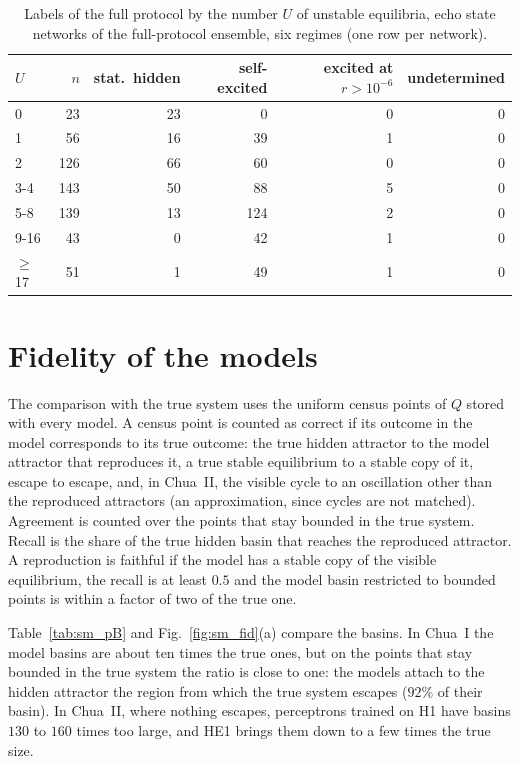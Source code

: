 \documentclass[aip,cha,preprint,amsmath,amssymb,longbibliography]{revtex4-2}
\begin{document}
\begin{table}
\caption{Labels of the full protocol by the number $U$ of unstable equilibria, echo state networks of the full-protocol
ensemble, six regimes (one row per network).}
\label{tab:sm_labels}
\begin{ruledtabular}
\begin{tabular}{lrrrrr}
$U$ & $n$ & stat.\ hidden & self-excited & excited at $r>10^{-6}$ & undetermined \\
\hline
0 & 23 & 23 & 0 & 0 & 0 \\
1 & 56 & 16 & 39 & 1 & 0 \\
2 & 126 & 66 & 60 & 0 & 0 \\
3-4 & 143 & 50 & 88 & 5 & 0 \\
5-8 & 139 & 13 & 124 & 2 & 0 \\
9-16 & 43 & 0 & 42 & 1 & 0 \\
$\ge$17 & 51 & 1 & 49 & 1 & 0 \\
\end{tabular}
\end{ruledtabular}
\end{table}


\section{Fidelity of the models}

The comparison with the true system uses the uniform census points of $Q$ stored with every model. A census point is counted
as correct if its outcome in the model corresponds to its true outcome: the true hidden attractor to the model attractor that
reproduces it, a true stable equilibrium to a stable copy of it, escape to escape, and, in Chua~II, the visible cycle to an
oscillation other than the reproduced attractors (an approximation, since cycles are not matched). Agreement is counted over
the points that stay bounded in the true system. Recall is the share of the true hidden basin that reaches the reproduced
attractor. A reproduction is faithful if the model has a stable copy of the visible equilibrium, the recall is at least
$0.5$ and the model basin restricted to bounded points is within a factor of two of the true one.

Table~\ref{tab:sm_pB} and Fig.~\ref{fig:sm_fid}(a) compare the basins. In Chua~I the model basins are about ten times the
true ones, but on the points that stay bounded in the true system the ratio is close to one: the models attach to the hidden
attractor the region from which the true system escapes ($92\%$ of their basin). In Chua~II, where nothing escapes,
perceptrons trained on H1 have basins $130$ to $160$ times too large, and HE1 brings them down to a few times the true size.
\end{document}
